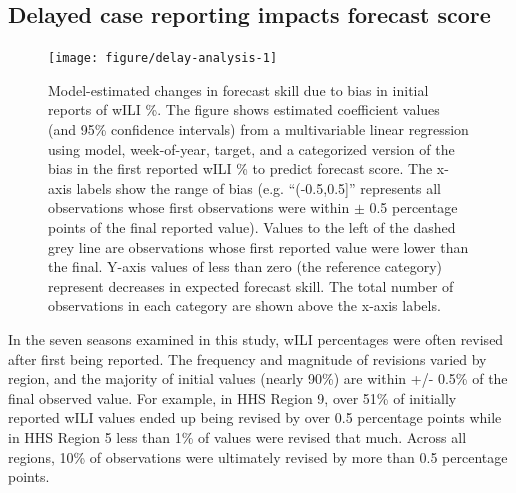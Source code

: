 \documentclass[9pt,twocolumn,twoside]{pnas-new}\usepackage[]{graphicx}\usepackage[]{color}
\newenvironment{knitrout}{}{} %
\begin{document}

\subsection*{Delayed case reporting impacts forecast score}\label{sec:delays}
\begin{knitrout}
\color{fgcolor}\begin{figure}
\texttt{[image: figure/delay-analysis-1]} \caption[Model-estimated changes in forecast skill due to bias in initial reports of wILI \%]{Model-estimated changes in forecast skill due to bias in initial reports of wILI \%. The figure shows estimated coefficient values (and 95\% confidence intervals) from a multivariable linear regression using model, week-of-year, target, and a categorized version of the bias in the first reported wILI \% to predict forecast score.  The x-axis labels show the range of bias (e.g. ``(-0.5,0.5]'' represents all observations whose first observations were within $\pm$ 0.5 percentage points of the final reported value). Values to the left of the dashed grey line are observations whose first reported value were lower than the final. Y-axis values of less than zero (the reference category) represent decreases in expected forecast skill. The total number of observations in each category are shown above the x-axis labels.}\label{fig:delay-analysis}
\end{figure}


\end{knitrout}

In the seven seasons examined in this study, wILI percentages were often revised after first being reported. 
The frequency and magnitude of revisions varied by region, and the majority of initial values (nearly 90\%) are within +/- 0.5\% of the final observed value.
For example, in HHS Region 9, over 51\% of initially reported wILI values ended up being revised by over 0.5 percentage points while in HHS Region 5 less than 1\% of values were revised that much. %
Across all regions, 10\% of observations were ultimately revised by more than 0.5 percentage points.
\end{document}
